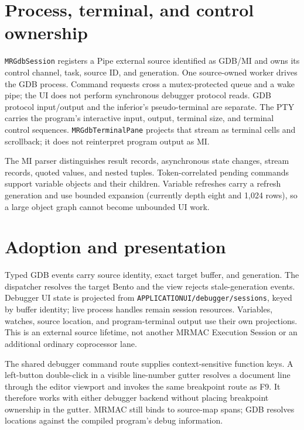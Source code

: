 \documentclass[a4paper,10pt,twoside,openany]{book}
\begin{document}
\section{Process, terminal, and control ownership}

\texttt{MRGdbSession} registers a Pipe external source identified as GDB/MI and
owns its control channel, task, source ID, and generation. One source-owned
worker drives the GDB process. Command requests cross a mutex-protected queue
and a wake pipe; the UI does not perform synchronous debugger protocol reads.
GDB protocol input/output and the inferior's pseudo-terminal are separate.
The PTY carries the program's interactive input, output, terminal size, and
terminal control sequences. \texttt{MRGdbTerminalPane} projects that stream as
terminal cells and scrollback; it does not reinterpret program output as MI.

The MI parser distinguishes result records, asynchronous state changes, stream
records, quoted values, and nested tuples. Token-correlated pending commands
support variable objects and their children. Variable refreshes carry a
refresh generation and use bounded expansion (currently depth eight and
1,024 rows), so a large object graph cannot become unbounded UI work.

\section{Adoption and presentation}

Typed GDB events carry source identity, exact target buffer, and generation.
The dispatcher resolves the target Bento and the view rejects stale-generation
events. Debugger UI state is projected from
\texttt{APPLICATIONUI/debugger/sessions}, keyed by buffer identity; live
process handles remain session resources. Variables, watches, source location,
and program-terminal output use their own projections. This is an external
source lifetime, not another MRMAC Execution Session or an additional ordinary
coprocessor lane.

The shared debugger command route supplies context-sensitive function keys.
A left-button double-click in a visible line-number gutter resolves a document
line through the editor viewport and invokes the same breakpoint route as F9.
It therefore works with either debugger backend without placing breakpoint
ownership in the gutter. MRMAC still binds to source-map spans; GDB resolves
locations against the compiled program's debug information.
\end{document}
